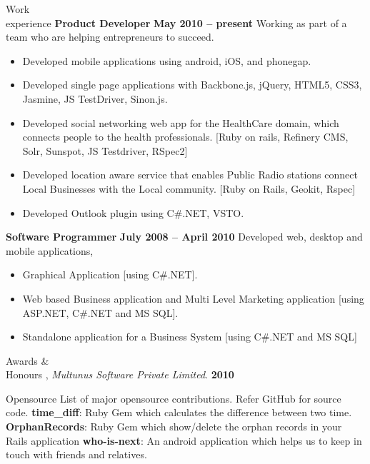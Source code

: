 \documentclass{resume}
\begin{document}
\begin{category}{Work \\experience}
  \citemnobullet \textbf{Product Developer} \hfill \textbf{May 2010 -- present}
  \citemnobullet Working as part of a team who are helping entrepreneurs to succeed.
  \begin{itemize}
  \item Developed mobile applications using android, iOS, and phonegap.
  \item Developed single page applications with Backbone.js, jQuery, HTML5, CSS3, Jasmine, JS TestDriver, Sinon.js.
  \item Developed social networking web app for the HealthCare domain, which connects people to the health professionals. [Ruby on rails, Refinery CMS, Solr, Sunspot, JS Testdriver, RSpec2]
  \item Developed location aware service that enables Public Radio stations connect Local Businesses with the Local community. [Ruby on Rails, Geokit, Rspec]
  \item Developed Outlook plugin using C\#.NET, VSTO.
  \end{itemize}
  \citemnobullet \textbf{Software Programmer} \hfill \textbf{July 2008 -- April 2010}
  \citemnobullet Developed web, desktop and mobile applications, 
  \begin{itemize} 
  \item Graphical Application [using C\#.NET].
  \item Web based Business application and Multi Level Marketing application [using ASP.NET, C\#.NET and MS SQL].
  \item Standalone application for a Business System [using C\#.NET and MS SQL]
  \end{itemize}
\end{category}


\begin{category}{Awards \&\\ Honours}
  , {\em Multunus Software Private Limited}. \hfill \textbf{2010}
\end{category}



\begin{category}{Opensource}
  \citemnobullet List of major opensource contributions. Refer GitHub for source code.
  \citembullet \textbf{time\_diff}: Ruby Gem which calculates the
  difference between two time.
  \citembullet \textbf{OrphanRecords}: Ruby Gem which show/delete the orphan records in your Rails application
  \citembullet \textbf{who-is-next}: An android application which helps us to keep in touch with friends and relatives.
\end{category}
\end{document}
